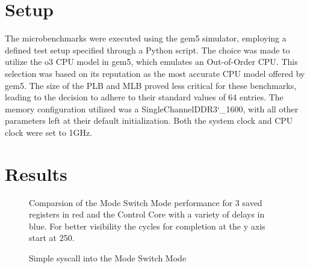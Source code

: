 \section{Setup}
The microbenchmarks were executed using the gem5 simulator, employing a defined
test setup specified through a Python script. The choice was made to utilize the
o3 CPU model in gem5, which emulates an Out-of-Order CPU. This selection was
based on its reputation as the most accurate CPU model offered by gem5. The size
of the PLB and MLB proved less critical for these benchmarks, leading to the
decision to adhere to their standard values of 64 entries. The memory
configuration utilized was a SingleChannelDDR3\char`_1600, with all other parameters
left at their default initialization. Both the system clock and CPU clock were
set to 1GHz.

\section{Results}

\begin{figure}[h]
    \centering
    
    \captionsetup{justification=centering}
    \caption{Simple syscall into the Mode Switch Mode}
        Comparsion of the Mode Switch Mode performance for 3 saved registers in
        red and the Control Core with a variety of delays in blue. For better
        visibility the  cycles for completion at the y axis start at 250.
    \label{fig:simple_modeswitch}
\end{figure}

